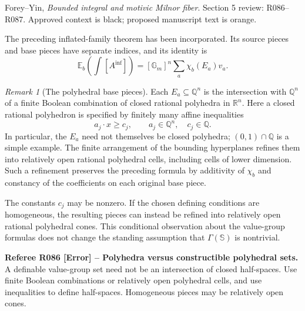 \documentclass[12pt]{amsart}
\theoremstyle{remark}
\newtheorem{rem}[thm]{Remark}
\theoremstyle{definition}
\newcommand{\Q}{\mathds{Q}}
\newcommand{\Sbase}{\mathbb S}
\numberwithin{equation}{section}
\newcommand{\Gm}{\mathbb G_m}
\newcommand{\E}{\mathbb E_b}
\theoremstyle{plain}
\newcommand{\R}{\mathds R}
\begin{document}
\setcounter{section}{5}
\setcounter{subsection}{1}
\setcounter{thm}{15}
{\small\noindent Forey--Yin, \emph{Bounded integral and motivic Milnor fiber}.
Section 5 review: R086--R087.
Approved context is black; proposed manuscript text is orange.}
\medskip

\noindent The preceding inflated-family theorem has been incorporated.
Its source pieces and base pieces have separate indices, and its
identity is
\[
 \E\!\left(\int[A^{\mathrm{inf}}]\right)
       =[\Gm]^n\sum_a\chi_b(E_a)v_a .
\]

{\color{ProposalOrange}
\begin{rem}[The polyhedral base pieces]
Each $E_a\subseteq\Q^n$ is the intersection with $\Q^n$ of
a finite Boolean combination of closed rational polyhedra in
$\R^n$. Here a closed rational polyhedron is specified by
finitely many affine inequalities
\[
 a_j\cdot x\geq c_j,\qquad a_j\in\Q^n,\quad c_j\in\Q.
\]
In particular, the $E_a$ need not themselves be closed
polyhedra; $(0,1)\cap\Q$ is a simple example.
The finite arrangement of the bounding hyperplanes refines
them into relatively open rational polyhedral cells, including
cells of lower dimension. Such a refinement preserves the
preceding formula by additivity of $\chi_b$ and constancy of
the coefficients on each original base piece.

The constants $c_j$ may be nonzero. If the chosen defining
conditions are homogeneous, the resulting pieces can instead
be refined into relatively open rational polyhedral cones.
This conditional observation about the value-group formulas
does not change the standing assumption that
$\Gamma(\Sbase)$ is nontrivial.
\end{rem}
}
\medskip
{\normalfont\small\color{RefereePurple}
\noindent\textbf{Referee R086 [Error] -- Polyhedra versus
constructible polyhedral sets.}
A definable value-group set need not be an intersection of closed
half-spaces. Use finite Boolean combinations or relatively open
polyhedral cells, and use inequalities to define half-spaces.
Homogeneous pieces may be relatively open cones.\par}
\medskip
\end{document}
